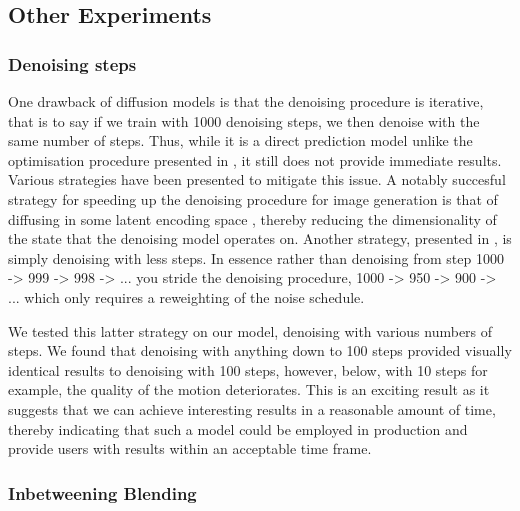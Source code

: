 \subsection{Other Experiments}
\subsubsection{Denoising steps}
One drawback of diffusion models is that the denoising procedure is iterative, that is to say if we train with 1000 denoising steps, we then denoise with the same number of steps. Thus, while it is a direct prediction model unlike the optimisation procedure presented in , it still does not provide immediate results. Various strategies have been presented to mitigate this issue. A notably succesful strategy for speeding up the denoising procedure for image generation is that of diffusing in some latent encoding space \cite{stable_diffusion}, thereby reducing the dimensionality of the state that the denoising model operates on. Another strategy, presented in \cite{improved_diffusion}, is simply denoising with less steps. In essence rather than denoising from step 1000 -> 999 -> 998 -> ... you stride the denoising procedure, 1000 -> 950 -> 900 -> ... which only requires a reweighting of the noise schedule. 

We tested this latter strategy on our model, denoising with various numbers of steps. We found that denoising with anything down to 100 steps provided visually identical results to denoising with 100 steps, however, below, with 10 steps for example, the quality of the motion deteriorates. This is an exciting result as it suggests that we can achieve interesting results in a reasonable amount of time, thereby indicating that such a model could be employed in production and provide users with results within an acceptable time frame.

\subsubsection{Inbetweening Blending}
\label{sec:diffusion_inbetweening_blending}

